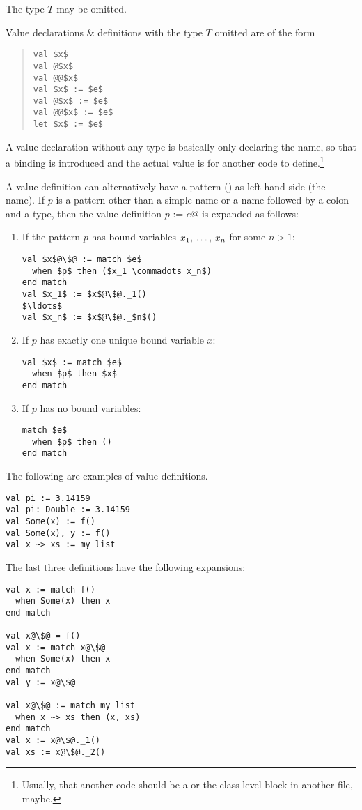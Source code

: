 The type $T$ may be omitted. 

Value declarations \& definitions with the type $T$ omitted are of the form
\begin{quote}\begin{lstlisting}
val $x$
val @$x$
val @@$x$
val $x$ := $e$
val @$x$ := $e$
val @@$x$ := $e$
let $x$ := $e$
\end{lstlisting}\end{quote}

A value declaration without any type is basically only declaring the name, so that a binding is introduced and the actual value is for another code to define.\footnote{Usually, that another code should be a  or the class-level block in another file, maybe.}

A value definition can alternatively have a pattern () as left-hand side (the name). If $p$ is a pattern other than a simple name or a name followed by a colon and a type, then the value definition \lstinline@val $p$ := $e$@ is expanded as follows: 

\begin{enumerate}
\item
If the pattern $p$ has bound variables $x_1 ,\, \ldots ,\, x_n$ for some $n > 1$:
\begin{lstlisting}[escapechar=@]
val $x$@\$@ := match $e$
  when $p$ then ($x_1 \commadots x_n$)
end match
val $x_1$ := $x$@\$@._1()
$\ldots$
val $x_n$ := $x$@\$@._$n$()
\end{lstlisting}

\item
If $p$ has exactly one unique bound variable $x$:
\begin{lstlisting}
val $x$ := match $e$
  when $p$ then $x$
end match
\end{lstlisting}

\item
If $p$ has no bound variables:
\begin{lstlisting}
match $e$
  when $p$ then ()
end match
\end{lstlisting}
\end{enumerate}

\example The following are examples of value definitions. 
\begin{lstlisting}
val pi := 3.14159
val pi: Double := 3.14159
val Some(x) := f() 
val Some(x), y := f()
val x ~> xs := my_list
\end{lstlisting}

The last three definitions have the following expansions:
\begin{lstlisting}[escapechar=@]
val x := match f()
  when Some(x) then x
end match

val x@\$@ = f()
val x := match x@\$@
  when Some(x) then x
end match
val y := x@\$@

val x@\$@ := match my_list
  when x ~> xs then (x, xs)
end match
val x := x@\$@._1()
val xs := x@\$@._2()
\end{lstlisting}

